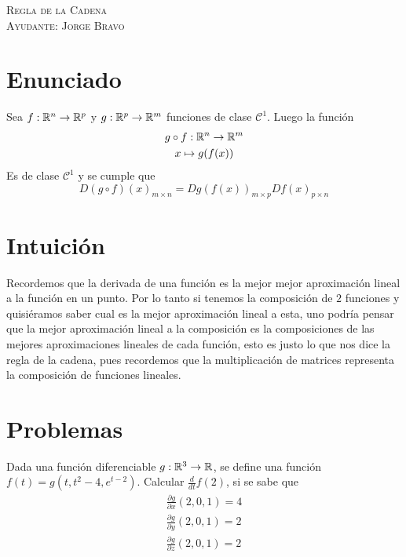 \documentclass[a4paper,oneside,10.5pt]{article}
\begin{document}
\begin{center}
{\Large \textsc{Regla de la Cadena}}\\
\vspace{1em}
\textsc{Ayudante: Jorge Bravo}\\
\end{center}

\section*{Enunciado}
 Sea $f: \mathbb{R}^{n} \to \mathbb{R}^p$ y $g: \mathbb{R}^p \to \mathbb{R}^m$ funciones de clase $\mathcal{C}^1$. Luego la función
\begin{gather*}
    g \circ f : \mathbb{R}^n \to \mathbb{R}^m\\
    x \mapsto g(f(x))
\end{gather*}
Es de clase $\mathcal{C}^1$ y se cumple que
\begin{equation*}
    D(g \circ f)(x)_{m \times n} = Dg(f(x))_{m \times p} Df(x)_{p \times n}
\end{equation*}

\section*{Intuici\'on}
Recordemos que la derivada de una función es la mejor mejor aproximación lineal a la función en un punto. Por lo tanto si tenemos la composición de $2$ funciones y quisiéramos saber cual es la mejor aproximación lineal a esta, uno podría pensar que la mejor aproximación lineal a la composición es la composiciones de las mejores aproximaciones lineales de cada función, esto es justo lo que nos dice la regla de la cadena, pues recordemos que la multiplicación de matrices representa la composición de funciones lineales.

\section*{Problemas}

\begin{prob}
    Dada una función diferenciable $g: \mathbb{R}^3 \to \mathbb{R}$, se define una función $f(t) = g(t, t^2 - 4, e^{t - 2})$. Calcular $\frac{d}{dt}f(2)$, si se sabe que
    \begin{gather*}
      \frac{\partial g}{\partial x}(2, 0, 1) = 4\\
      \frac{\partial g}{\partial y}(2, 0, 1) = 2\\
      \frac{\partial g}{\partial z}(2, 0, 1) = 2
    \end{gather*}
\end{prob}
\end{document}
